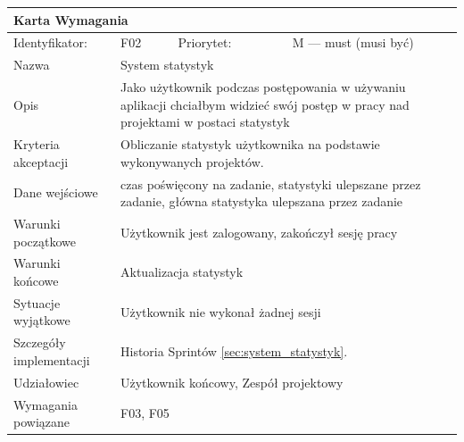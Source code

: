 \documentclass[a4paper,11pt]{report}
\begin{document}
		\begin{tabular}{|p{3cm}|p{2cm}|p{2cm}|p{6cm}|}
		\hline
		\multicolumn{4}{|p{12 cm}|}{Karta Wymagania}\\
		\hline
		Identyfikator: & F02 & Priorytet: & M — must (musi być)\\
		\hline
		Nazwa & \multicolumn{3}{|p{10 cm}|}{System statystyk}\\
		\hline
		Opis & \multicolumn{3}{|p{10 cm}|}{Jako użytkownik podczas postępowania w używaniu aplikacji chciałbym widzieć swój postęp w pracy nad projektami w postaci statystyk}\\
		\hline
		Kryteria akceptacji & \multicolumn{3}{|p{10 cm}|}{Obliczanie statystyk użytkownika na podstawie wykonywanych projektów.}\\
		\hline
		Dane wejściowe & \multicolumn{3}{|p{10 cm}|}{czas poświęcony na zadanie, statystyki ulepszane przez zadanie, główna statystyka ulepszana przez zadanie}\\
		\hline
		Warunki początkowe & \multicolumn{3}{|p{10 cm}|}{Użytkownik jest zalogowany, zakończył sesję pracy}\\
		\hline
		Warunki końcowe & \multicolumn{3}{|p{10 cm}|}{Aktualizacja statystyk}\\
		\hline
		Sytuacje wyjątkowe & \multicolumn{3}{|p{10 cm}|}{Użytkownik nie wykonał żadnej sesji}\\
		\hline
		Szczegóły implementacji & \multicolumn{3}{|p{10 cm}|}{Historia Sprintów \ref{sec:system_statystyk}.}\\
		\hline
		Udziałowiec & \multicolumn{3}{|p{10 cm}|}{Użytkownik końcowy, Zespół projektowy}\\
		\hline
		Wymagania powiązane & \multicolumn{3}{|p{10 cm}|}{F03, F05}\\
		\hline
		\end{tabular}\\
		\newline
		\vspace*{0,2 cm}
		\newline
\end{document}
